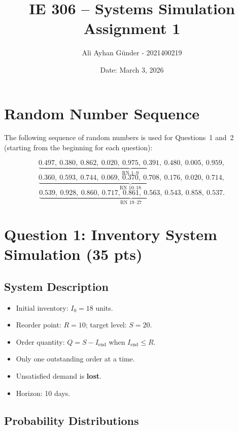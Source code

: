 \documentclass[12pt,a4paper]{article}
\title{\textbf{IE 306 -- Systems Simulation}\\[0.3em]
       \large Assignment 1}
\author{Ali Ayhan Günder - 2021400219}
\date{Date: March 3, 2026}
\begin{document}
\maketitle



\tableofcontents
\newpage

\section{Random Number Sequence}
The following sequence of random numbers is used for Questions~1 and~2 (starting from the beginning for each question):

\[
\underbrace{0.497,\ 0.380,\ 0.862,\ 0.020,\ 0.975,\ 0.391,\ 0.480,\ 0.005,\ 0.959}_{\text{RN 1--9}},
\]
\[
\underbrace{0.360,\ 0.593,\ 0.744,\ 0.069,\ 0.370,\ 0.708,\ 0.176,\ 0.020,\ 0.714}_{\text{RN 10--18}},
\]
\[
\underbrace{0.539,\ 0.928,\ 0.860,\ 0.717,\ 0.861,\ 0.563,\ 0.543,\ 0.858,\ 0.537}_{\text{RN 19--27}}.
\]

\section{Question 1: Inventory System Simulation (35 pts)}

\subsection{System Description}
\begin{itemize}
  \item Initial inventory: $I_0 = 18$ units.
  \item Reorder point: $R=10$; target level: $S=20$.
  \item Order quantity: $Q = S - I_{\text{end}}$ when $I_{\text{end}} \leq R$.
  \item Only one outstanding order at a time.
  \item Unsatisfied demand is \textbf{lost}.
  \item Horizon: 10 days.
\end{itemize}

\subsection{Probability Distributions}
\end{document}
